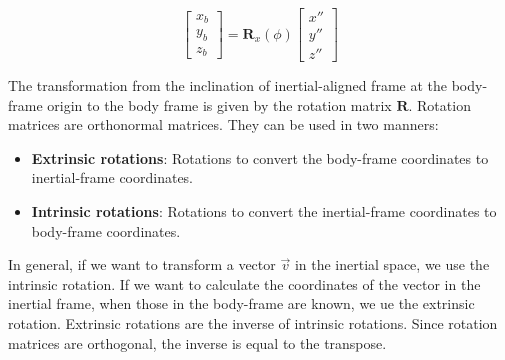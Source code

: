 \begin{itemize}
\begin{equation}
              \begin{bmatrix}
                  x_b \\
                  y_b \\
                  z_b
              \end{bmatrix} = \mathbf{R}_x(\phi)
              \begin{bmatrix}
                  x'' \\
                  y'' \\
                  z''
              \end{bmatrix}
          \end{equation}
\end{itemize}

The transformation from the inclination of inertial-aligned frame at the body-frame origin to the body frame is given by the rotation matrix \( \mathbf{R} \). Rotation matrices are orthonormal matrices.
They can be used in two manners:
\begin{itemize}
    \item \textbf{Extrinsic rotations}: Rotations to convert the body-frame coordinates to inertial-frame coordinates.
    \item \textbf{Intrinsic rotations}: Rotations to convert the inertial-frame coordinates to body-frame coordinates.
\end{itemize}
In general, if we want to transform a vector \( \vec{v} \) in the inertial space, we use the intrinsic rotation.
If we want to calculate the coordinates of the vector in the inertial frame, when those in the body-frame are known, we ue the extrinsic rotation.
Extrinsic rotations are the inverse of intrinsic rotations. Since rotation matrices are orthogonal, the inverse is equal to the transpose.

